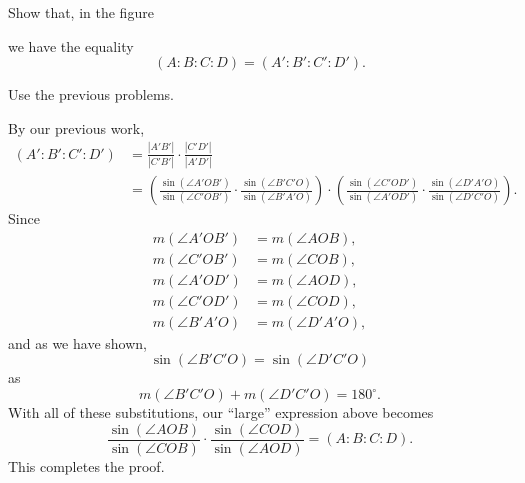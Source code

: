 \documentclass{ximera}
\begin{document}
\begin{problem}\label{50}
Show that, in the figure%
\begin{image}
\end{image}
we have the equality%
\[
\left(  A:B:C:D\right)  =\left(A':B':C':D'\right)  .
\]


\begin{hint}
Use the previous problems. 
\end{hint}

\begin{freeResponse}
By our previous work, 
\begin{align*}
(A':B':C':D') &=\frac{|A'B'|}{|C'B'|}\cdot\frac{|C'D'|}{|A'D'|}\\
&=\left(\frac{\sin(\angle A'OB')}{\sin(\angle C'OB')}\cdot 
\frac{
\sin(\angle B'C'O)
}{
\sin(\angle B'A'O)
}\right) 
\cdot\left(\frac{
\sin(\angle C'OD')
}{
\sin(\angle A'OD')
}\cdot\frac{\sin(\angle D'A'O)}{\sin(\angle D'C'O)}\right).
\end{align*}
Since 
\begin{align*}
m(\angle A'OB') &= m(\angle AOB),\\
m(\angle C'OB') &= m(\angle COB),\\
m(\angle A'OD') &= m(\angle AOD),\\
m(\angle C'OD') &= m(\angle COD),\\
m(\angle B'A'O) &= m(\angle D'A'O),
\end{align*}
and as we have shown, 
\[
\sin(\angle B'C'O) = \sin(\angle D'C'O)
\]
as 
\[
m(\angle B'C'O) + m(\angle D'C'O) = 180^\circ.
\]
With all of these substitutions, our ``large'' expression above becomes
\[
\frac{\sin(\angle AOB)}{\sin(\angle COB)} \cdot\frac{
\sin(\angle COD)
}{
\sin(\angle AOD)
} = (A:B:C:D). 
\]
This completes the proof. 
\end{freeResponse}
\end{problem}
\end{document}
